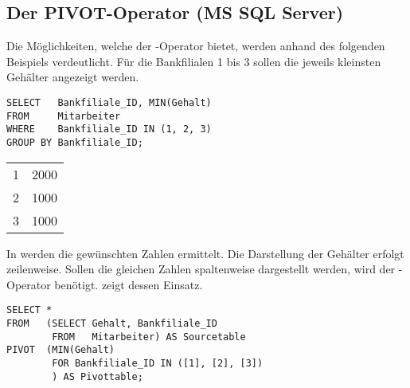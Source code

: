 \subsection{Der PIVOT-Operator (MS SQL Server)}
Die Möglichkeiten, welche der -Operator bietet, werden anhand des folgenden Beispiels verdeutlicht. Für die Bankfilialen 1 bis 3 sollen die jeweils kleinsten Gehälter angezeigt werden.
\begin{lstlisting}[language=ms_sql,caption={Die niedrigsten Gehälter in den Filialen 1 bis 3},label=sql06_22]
SELECT   Bankfiliale_ID, MIN(Gehalt)
FROM     Mitarbeiter
WHERE    Bankfiliale_ID IN (1, 2, 3)
GROUP BY Bankfiliale_ID;
        \end{lstlisting}
\begin{center}
    \begin{small}
        \tablehead{}
        \begin{mssql}
            \begin{supertabular}{ll}
                1 & 2000 \\
                2 & 1000 \\
                3 & 1000 \\
            \end{supertabular}
        \end{mssql}
    \end{small}
\end{center}
In  werden die gewünschten Zahlen ermittelt. Die Darstellung der Gehälter erfolgt zeilenweise. Sollen die gleichen Zahlen spaltenweise dargestellt werden, wird der -Operator benötigt.  zeigt dessen Einsatz.
\begin{lstlisting}[language=ms_sql,caption={Das Ergebnis als Pivottabelle},label=sql06_23]
SELECT *
FROM   (SELECT Gehalt, Bankfiliale_ID
        FROM   Mitarbeiter) AS Sourcetable
PIVOT  (MIN(Gehalt)
        FOR Bankfiliale_ID IN ([1], [2], [3])
        ) AS Pivottable;
        \end{lstlisting}
